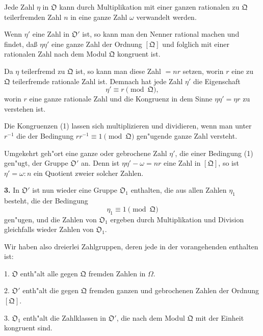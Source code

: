 \documentclass[12pt,a4paper]{article}
\theoremstyle{plain}
\begin{document}
Jede Zahl $\eta$ in $\mathfrak{O}$ kann durch Multiplikation mit einer ganzen rationalen zu $\mathfrak{Q}$ teilerfremden Zahl $n$ in eine ganze Zahl $\omega$ verwandelt werden.

Wenn $\eta'$ eine Zahl in $\mathfrak{O}'$ ist, so kann man den Nenner rational machen und findet, da\ss{} $\eta\eta'$ eine ganze Zahl der Ordnung $[\mathfrak{Q}]$ und folglich mit einer rationalen Zahl nach dem Modul $\mathfrak{Q}$ kongruent ist.

Da $\eta$ teilerfremd zu $\mathfrak{Q}$ ist, so kann man diese Zahl $= nr$ setzen, worin $r$ eine zu $\mathfrak{Q}$ teilerfremde rationale Zahl ist. Demnach hat jede Zahl $\eta'$ die Eigenschaft
\begin{equation}
\eta' \equiv r \pmod{\mathfrak{Q}},
\tag{1}
\end{equation}
worin $r$ eine ganze rationale Zahl und die Kongruenz in dem Sinne $\eta\eta' = \eta r$ zu verstehen ist.

Die Kongruenzen (1) lassen sich multiplizieren und dividieren, wenn man unter $r^{-1}$ die der Bedingung $rr^{-1} \equiv 1 \pmod{\mathfrak{Q}}$ gen"ugende ganze Zahl versteht.

Umgekehrt geh"ort eine ganze oder gebrochene Zahl $\eta'$, die einer Bedingung (1) gen"ugt, der Gruppe $\mathfrak{O}'$ an. Denn ist $\eta\eta' - \omega = nr$ eine Zahl in $[\mathfrak{Q}]$, so ist $\eta' = \omega:n$ ein Quotient zweier solcher Zahlen.

\textbf{3.} In $\mathfrak{O}'$ ist nun wieder eine Gruppe $\mathfrak{O}_1$ enthalten, die aus allen Zahlen $\eta_1$ besteht, die der Bedingung
\begin{equation}
\eta_1 \equiv 1 \pmod{\mathfrak{Q}}
\tag{2}
\end{equation}
gen"ugen, und die Zahlen von $\mathfrak{O}_1$ ergeben durch Multiplikation und Division gleichfalls wieder Zahlen von $\mathfrak{O}_1$.

Wir haben also dreierlei Zahlgruppen, deren jede in der vorangehenden enthalten ist:

1. $\mathfrak{O}$ enth"alt alle gegen $\mathfrak{Q}$ fremden Zahlen in $\Omega$.

2. $\mathfrak{O}'$ enth"alt die gegen $\mathfrak{Q}$ fremden ganzen und gebrochenen Zahlen der Ordnung $[\mathfrak{Q}]$.

3. $\mathfrak{O}_1$ enth"alt die Zahlklassen in $\mathfrak{O}'$, die nach dem Modul $\mathfrak{Q}$ mit der Einheit kongruent sind.
\end{document}
